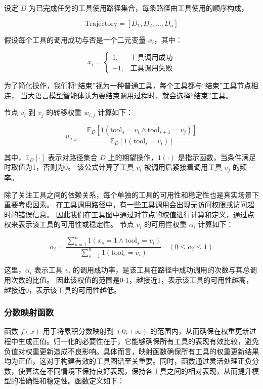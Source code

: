设定 $D$ 为已完成任务的工具使用路径集合，每条路径由工具使用的顺序构成，

\[
\text{Trajectory} = [D_1, D_2, \ldots, D_n]
\]

假设每个工具的调用成功与否是一个二元变量 $x_i$，其中：

\[
x_i = 
\begin{cases} 
1, & \text{工具调用成功} \\
-1, & \text{工具调用失败}
\end{cases}
\]

为了简化操作，我们将“结束”视为一种普通工具，每个工具都与“结束”工具节点相连，
当大语言模型智能体认为要结束调用过程时，就会选择“结束”工具。

节点 $v_i$ 到 $v_j$ 的转移权重 $w_{i,j}$ 计算如下：

\[
w_{i,j} = \frac{\mathbb{E}_D[1(\text{tool}_s = v_i \land \text{tool}_{s+1} = v_j)]}{\mathbb{E}_D[1(\text{tool}_s = v_i)]}
\]

其中，$\mathbb{E}_D[\cdot]$ 表示对路径集合 $D$ 上的期望操作，$1(\cdot)$ 是指示函数，当条件满足时取值为1，否则为0。
该公式计算了工具 $v_i$ 被调用后紧接着调用工具 $v_j$ 的频率。

除了关注工具之间的依赖关系，每个单独的工具的可用性和稳定性也是真实场景下重要考虑因素。
在工具调用路径中，有一些工具调用会出现无访问权限或访问超时的错误信息。
因此我们在工具图中通过对节点的权值进行计算和定义，通过点权来表示该工具的可用性或稳定性。
节点 $v_i$ 的可用性权重 $\alpha_i$ 计算如下：

\[
\alpha_i = \frac{\sum_{s=1}^{n} 1(x_s = 1 \land \text{tool}_s = v_i)}{\sum_{s=1}^{n} 1(\text{tool}_s = v_i)} \quad (0 \leq \alpha_i \leq 1)
\]

这里，$\alpha_i$ 表示工具 $v_i$ 的调用成功率，是该工具在路径中成功调用的次数与其总调用次数的比值。
因此该权值的范围是0-1，越接近1，表示该工具的可用性越高，越接近0，表示该工具的可用性越低。

\subsubsection{分数映射函数}

函数 $f(x)$ 用于将累积分数映射到 $(0, +\infty)$ 的范围内，从而确保在权重更新过程中生成正值。归一化的必要性在于，它能够确保所有工具的表现有效比较，避免负值对权重更新造成不良影响。具体而言，映射函数确保所有工具的权重更新结果均为正值，这对于构建有效的工具图谱至关重要。同时，函数通过灵活处理正负分数，使算法在不同情境下保持良好表现，保持各工具之间的相对表现，从而提升模型的准确性和稳定性。函数定义如下：

